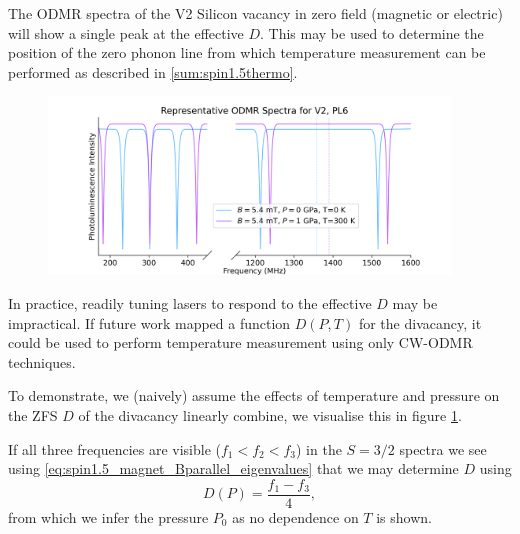 The ODMR spectra of the V2 Silicon vacancy in zero field (magnetic or electric) will show a single peak at the effective $D$. 
This may be used to determine the position of the zero phonon line from which temperature measurement can be performed as described in \ref{sum:spin1.5thermo}. 

\begin{figure}[h]
    \begin{center}
        \includegraphics[width=0.95\textwidth]{figures/ODMR-multimodal-s15magnet-s1PT.png}
    \end{center}
    \caption{}\label{fig:multi-TP}
\end{figure}




In practice, readily tuning lasers to respond to the effective $D$ may be impractical. If future work mapped a function $D(P,T)$ for the divacancy, it could be used to perform temperature measurement using only CW-ODMR techniques. 

To demonstrate, we (naively) assume the effects of temperature and pressure on the ZFS $D$ of the divacancy linearly combine, we visualise this in figure \ref{fig:multi-TP}. 

If all three frequencies are visible ($f_1 < f_2 < f_3$) in the $S=3/2$ spectra we see using \eqref{eq:spin1.5_magnet_Bparallel_eigenvalues} that we may determine $D$ using 
\begin{equation}
    D(P) = \frac{f_1 -f_3 }{4},
    \label{eq:}
\end{equation}
from which we infer the pressure $P_0$ as no dependence on $T$ is shown.     

